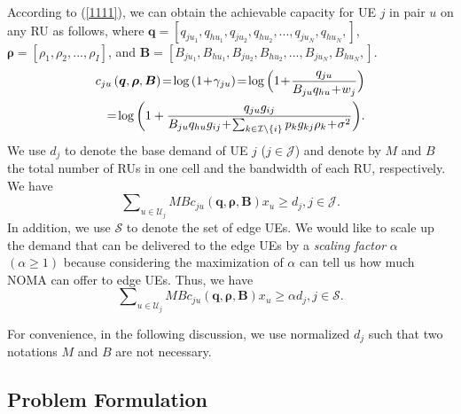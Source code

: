 \documentclass[10pt,journal,final,finalsubmission,twocolumn]{IEEEtran}
\begin{document}
According to (\ref{1111}), we can obtain the achievable capacity for UE $j$ in pair $u$ on any RU as follows, where $\boldsymbol{q}=[q_{ju_1},q_{hu_1},q_{ju_2},q_{hu_2},...,q_{ju_N},q_{hu_N},]$, $\boldsymbol{\rho}=[\rho_1,\rho_2,..., \rho_I]$, and $\boldsymbol{B}=[B_{ju_1},B_{hu_1},B_{ju_2},B_{hu_2},...,B_{ju_N},B_{hu_N},]$.
\begin{align}\label{cju0}
c_{ju}\left (\boldsymbol{q},\boldsymbol{ \rho}, \boldsymbol{B}\right )\!=\!\log \left ( 1\!+\!\gamma_{ju} \right )\!=\!\log \Big ( 1\!+\!\frac{q_{ju}}{B_{ju}q_{hu}\!+\!w_j} \Big )\notag\\
=\!\log \bigg ( 1+\frac{q_{ju}g_{ij}}{{B_{ju}q_{hu}g_{ij}}\!+\!{\sum_{k\in \mathcal{I}\setminus \left \{ i \right \}}p_kg_{kj}\rho_k}\!+\!\sigma ^2} \bigg ).
\end{align}
We use $d_j$ to denote the base demand of UE $j$ ($j \in \mathcal{J}$) and denote by $M$ and $B$ the total number of RUs in one cell and the bandwidth of each RU, respectively. We have
\begin{equation}
\sum\nolimits_{u\in {\mathcal{U}}_j} M B c_{ju}\left (\boldsymbol{q},\boldsymbol{ \rho}, \boldsymbol{B}\right )x_u\geq d_j, j \in \mathcal{J}.
\end{equation}
In addition, we use $\mathcal{S}$ to denote the set of edge UEs. We would like to scale up the demand that can be delivered to the edge UEs by a {\em scaling factor} $\alpha$ $\left (\alpha \geq 1\right)$ because considering the maximization of $\alpha$ can tell us how much NOMA can offer to edge UEs. Thus, we have
\begin{equation}
\sum\nolimits_{u\in {\mathcal{U}}_j} M B c_{ju}\left (\boldsymbol{q},\boldsymbol{ \rho}, \boldsymbol{B}\right )x_u\geq \alpha d_j,j\in \mathcal{S}.
\end{equation}

For convenience, in the following discussion, we use normalized $d_j$ such that two notations $M$ and $B$ are not necessary.

\subsection{Problem Formulation}\label{MathematicalFormulation}
\end{document}
